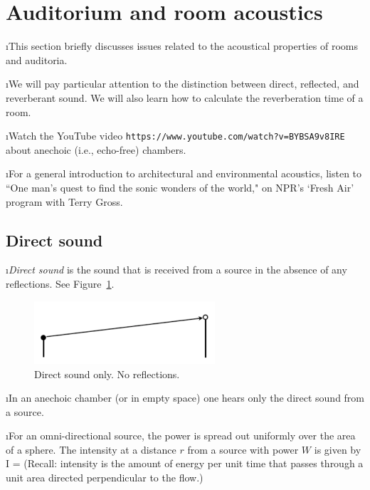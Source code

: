 \section{Auditorium and room acoustics}

\bi

\i This section briefly discusses issues related to the 
acoustical properties of rooms and auditoria.

\i We will pay particular attention to the distinction
between direct, reflected, and reverberant sound.
We will also learn how to calculate the reverberation
time of a room.

\i \demo Watch the YouTube video
{\tt https://www.youtube.com/watch?v=BYBSA9v8IRE}
about anechoic (i.e., echo-free) chambers.

\i \demo For a general introduction to architectural
and environmental acoustics, listen to 
``One man's quest to find the sonic wonders of the world,"
on NPR's `Fresh Air' program with Terry Gross.

\ei
\subsection{Direct sound}
\bi

\i {\em Direct sound} is the sound that is 
received from a source in the absence of any reflections.
See Figure~\ref{f:direct_sound}.
%
\begin{figure}[htbp]
\begin{center}
\includegraphics[width=0.6\textwidth]{reflection_0}
\caption{Direct sound only.
No reflections.}
\label{f:direct_sound}
\end{center}
\end{figure}
%

\i In an anechoic chamber (or in empty space) one 
hears only the direct sound from a source.

\i For an omni-directional source, the power is spread
out uniformly over the area of a sphere.
The intensity at a distance $r$ from a source with 
power $W$ is given by
%
\be
I = 
\ee
%
(Recall: intensity is the amount of energy per unit
time that passes through a unit area directed perpendicular
to the flow.)

